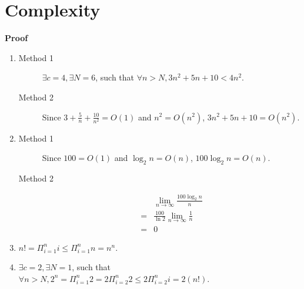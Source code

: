 \documentclass{../../cls/sig-alternate-05-2015}
\begin{document}
\section{Complexity}
\textbf{Proof}\begin{enumerate}[label=(\alph*)]
	\item \begin{description}
		\item[Method 1] $\exists c = 4, \exists N = 6$, such that $\forall n > N, 3n^2 + 5n + 10 < 4n^2$.
		\item[Method 2] Since $3 + \frac{5}{n} + \frac{10}{n^2} = O(1)$ and $n^2 = O(n^2)$, $3n^2 + 5n + 10 = O(n^2)$.
	\end{description}
	\item \begin{description}
		\item[Method 1] Since $100 = O(1)$ and $\log_2 n = O(n)$, $100\log_2 n = O(n)$.
		\item[Method 2] \begin{align}
			& \lim\limits_{n \rightarrow \infty} \frac{100\log_2 n}{n}\\
			= & \frac{100}{\ln 2} \lim\limits_{n \rightarrow \infty} \frac{1}{n}\\
			= & 0
		\end{align}
	\end{description}
	\item $n! = \Pi_{i = 1}^n i \le \Pi_{i = 1}^n n = n^n$.
	\item $\exists c = 2, \exists N = 1$, such that $\forall n > N, 2^n = \Pi_{i = 1}^n 2 = 2 \Pi_{i = 2}^n 2 \le 2 \Pi_{i = 2}^n i = 2(n!)$.
\end{enumerate}
\end{document}
